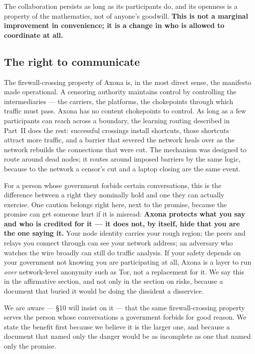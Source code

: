 \documentclass[nobib,justified]{tufte-handout}
\begin{document}
The collaboration persists as long as its participants do, and its openness is a
property of the mathematics, not of anyone's goodwill. \textbf{This is not a
marginal improvement in convenience; it is a change in who is allowed to
coordinate at all.}

\subsection{The right to communicate}

The firewall-crossing property of Axona is, in the most direct sense, the
manifesto made operational. A censoring authority maintains control by
controlling the intermediaries --- the carriers, the platforms, the chokepoints
through which traffic must pass. Axona has no content chokepoints to control. As
long as a few participants can reach across a boundary, the learning routing
described in Part~II does the rest: successful crossings install shortcuts,
those shortcuts attract more traffic, and a barrier that severed the network
heals over as the network rebuilds the connections that were cut. The mechanism
was designed to route around dead nodes; it routes around imposed barriers by the
same logic, because to the network a censor's cut and a laptop closing are the
same event.

For a person whose government forbids certain conversations, this is the
difference between a right they nominally hold and one they can actually
exercise. One caution belongs right here, next to the promise, because the
promise can get someone hurt if it is misread: \textbf{Axona protects what you
say and who is credited for it --- it does not, by itself, hide that you are the
one saying it.} Your node identity carries your rough region; the peers and
relays you connect through can see your network address; an adversary who
watches the wire broadly can still do traffic analysis. If your safety depends on
your government not knowing you are participating at all, Axona is a layer to run
\emph{over} network-level anonymity such as Tor, not a replacement for it. We say
this in the affirmative section, and not only in the section on risks, because a
document that buried it would be doing the dissident a disservice.

We are aware --- \S10 will insist on it --- that the same firewall-crossing
property serves the person whose conversations a government forbids for good
reason. We state the benefit first because we believe it is the larger one, and
because a document that named only the danger would be as incomplete as one that named only the promise.
\end{document}
